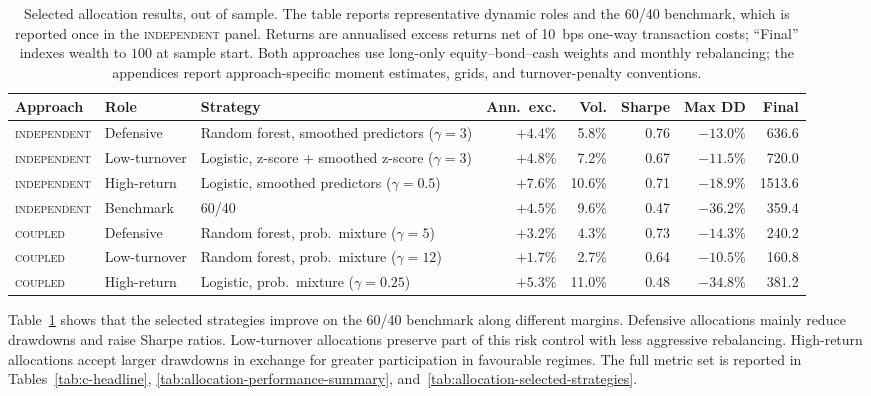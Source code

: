 \documentclass[10pt]{article}
\newcommand{\Acoup}{\textsc{coupled}}
\newcommand{\Bindep}{\textsc{independent}}
\begin{document}
\begin{table}[H]
    \centering
    \caption{Selected allocation results, out of sample. The table reports representative dynamic
        roles and the 60/40 benchmark, which is reported once in the \Bindep{} panel. Returns are annualised excess returns net of 10~bps one-way
        transaction costs; ``Final'' indexes wealth to \(100\) at sample start. Both approaches use
        long-only equity--bond--cash weights and monthly rebalancing; the appendices report
        approach-specific moment estimates, grids, and turnover-penalty conventions.}
    \label{tab:alloc-frontier}
    \small
    \begin{adjustbox}{center,max width=1.12\textwidth}
        \begin{tabular}{@{}lllrrrrr@{}}
            \toprule
            Approach  & Role         & Strategy                              & Ann.\ exc. & Vol.   & Sharpe & Max DD    & Final \\
            \midrule
            \Bindep{} & Defensive    & Random forest, smoothed predictors ($\gamma{=}3$)    & $+4.4\%$   & 5.8\%  & 0.76   & $-13.0\%$ & 636.6 \\
            \Bindep{} & Low-turnover & Logistic, z-score + smoothed z-score ($\gamma{=}3$)  & $+4.8\%$   & 7.2\%  & 0.67   & $-11.5\%$ & 720.0 \\
            \Bindep{} & High-return  & Logistic, smoothed predictors ($\gamma{=}0.5$)         & $+7.6\%$   & 10.6\%  & 0.71   & $-18.9\%$ & 1513.6 \\
            \Bindep{} & Benchmark    & 60/40                                 & $+4.5\%$   & 9.6\%  & 0.47   & $-36.2\%$ & 359.4 \\
            \midrule
            \Acoup{}  & Defensive    & Random forest, prob.\ mixture ($\gamma{=}5$)  & $+3.2\%$ & 4.3\%  & 0.73   & $-14.3\%$ & 240.2 \\
            \Acoup{}  & Low-turnover & Random forest, prob.\ mixture ($\gamma{=}12$) & $+1.7\%$ & 2.7\%  & 0.64   & $-10.5\%$ & 160.8 \\
            \Acoup{}  & High-return  & Logistic, prob.\ mixture ($\gamma{=}0.25$)    & $+5.3\%$ & 11.0\% & 0.48   & $-34.8\%$ & 381.2 \\
            \bottomrule
        \end{tabular}
    \end{adjustbox}
\end{table}

Table~\ref{tab:alloc-frontier} shows that the selected strategies improve on the 60/40
benchmark along different margins. Defensive allocations mainly reduce drawdowns and raise
Sharpe ratios. Low-turnover allocations preserve part of this risk control with
less aggressive rebalancing. High-return allocations accept larger drawdowns in exchange for
greater participation in favourable regimes. The full metric set is reported in
Tables~\ref{tab:c-headline}, \ref{tab:allocation-performance-summary},
and~\ref{tab:allocation-selected-strategies}.
\end{document}

